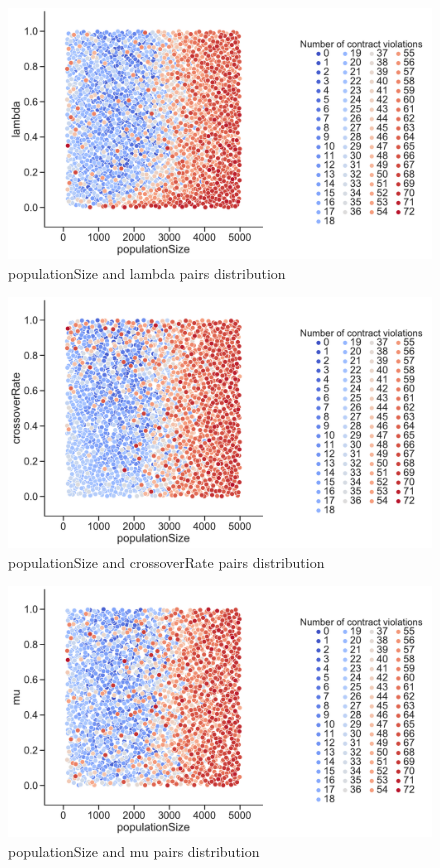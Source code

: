 \begin{figure}
	\centering
	\includegraphics[width=\textwidth]{images/PairsDistr/populationSize_lambda.pdf}
	\caption[populationSize and lambda pairs distribution]{populationSize and lambda pairs distribution}
	\label{fig:populationSize_lambda_pair}
\end{figure}
\clearpage
\begin{figure}
	\centering
	\includegraphics[width=\textwidth]{images/PairsDistr/populationSize_crossoverRate.pdf}
	\caption[populationSize and crossoverRate pairs distribution]{populationSize and crossoverRate pairs distribution}
	\label{fig:populationSize_crossoverRate_pair}
\end{figure}
\clearpage
\begin{figure}
	\centering
	\includegraphics[width=\textwidth]{images/PairsDistr/populationSize_mu.pdf}
	\caption[populationSize and mu pairs distribution]{populationSize and mu pairs distribution}
	\label{fig:populationSize_mu_pair}
\end{figure}
